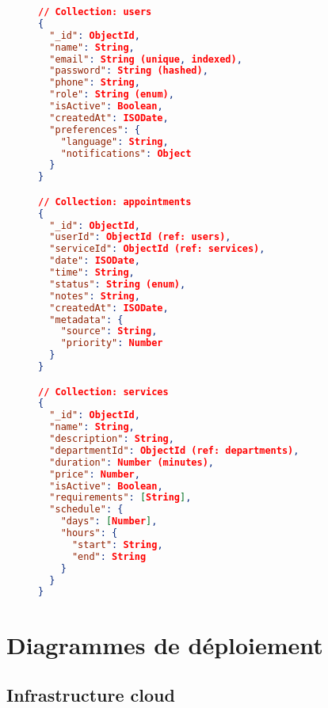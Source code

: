 \begin{figure}[H]
\centering
\lstset{
    basicstyle=\tiny\ttfamily,
    frame=single,
    breaklines=true,
    captionpos=b
}
\begin{lstlisting}[language=json, caption=Structure JSON des collections MongoDB]
// Collection: users
{
  "_id": ObjectId,
  "name": String,
  "email": String (unique, indexed),
  "password": String (hashed),
  "phone": String,
  "role": String (enum),
  "isActive": Boolean,
  "createdAt": ISODate,
  "preferences": {
    "language": String,
    "notifications": Object
  }
}

// Collection: appointments  
{
  "_id": ObjectId,
  "userId": ObjectId (ref: users),
  "serviceId": ObjectId (ref: services),
  "date": ISODate,
  "time": String,
  "status": String (enum),
  "notes": String,
  "createdAt": ISODate,
  "metadata": {
    "source": String,
    "priority": Number
  }
}

// Collection: services
{
  "_id": ObjectId,
  "name": String,
  "description": String,
  "departmentId": ObjectId (ref: departments),
  "duration": Number (minutes),
  "price": Number,
  "isActive": Boolean,
  "requirements": [String],
  "schedule": {
    "days": [Number],
    "hours": {
      "start": String,
      "end": String
    }
  }
}
\end{lstlisting}
\end{figure}

\section{Diagrammes de déploiement}

\subsection{Infrastructure cloud}


